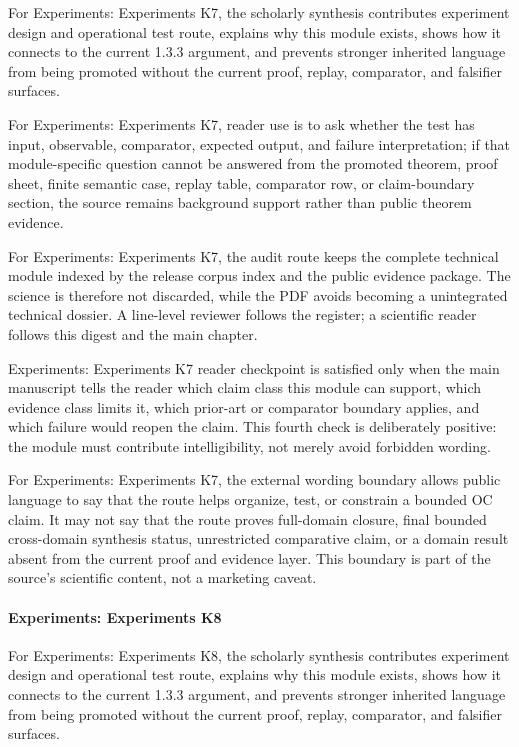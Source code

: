 For Experiments: Experiments K7, the scholarly synthesis contributes experiment design and operational test route, explains why this module exists, shows how it connects to the current 1.3.3 argument, and prevents stronger inherited language from being promoted without the current proof, replay, comparator, and falsifier surfaces.


For Experiments: Experiments K7, reader use is to ask whether the test has input, observable, comparator, expected output, and failure interpretation; if that module-specific question cannot be answered from the promoted theorem, proof sheet, finite semantic case, replay table, comparator row, or claim-boundary section, the source remains background support rather than public theorem evidence.


For Experiments: Experiments K7, the audit route keeps the complete technical module indexed by the release corpus index and the public evidence package. The science is therefore not discarded, while the PDF avoids becoming a unintegrated technical dossier. A line-level reviewer follows the register; a scientific reader follows this digest and the main chapter.


Experiments: Experiments K7 reader checkpoint is satisfied only when the main manuscript tells the reader which claim class this module can support, which evidence class limits it, which prior-art or comparator boundary applies, and which failure would reopen the claim. This fourth check is deliberately positive: the module must contribute intelligibility, not merely avoid forbidden wording.


For Experiments: Experiments K7, the external wording boundary allows public language to say that the route helps organize, test, or constrain a bounded OC claim. It may not say that the route proves full-domain closure, final bounded cross-domain synthesis status, unrestricted comparative claim, or a domain result absent from the current proof and evidence layer. This boundary is part of the source's scientific content, not a marketing caveat.


\paragraph{Experiments: Experiments K8}

For Experiments: Experiments K8, the scholarly synthesis contributes experiment design and operational test route, explains why this module exists, shows how it connects to the current 1.3.3 argument, and prevents stronger inherited language from being promoted without the current proof, replay, comparator, and falsifier surfaces.


